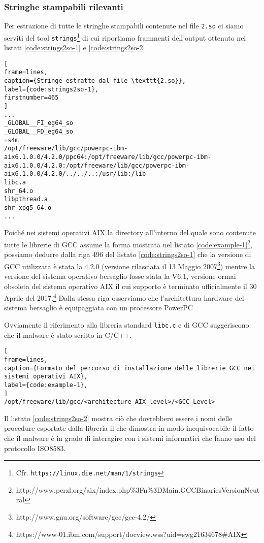 \documentclass[10pt,a4paper, titlepage]{report}
\begin{document}
\subsubsection{Stringhe stampabili rilevanti}\label{strings2so}

Per estrazione di tutte le stringhe stampabili contenute nel file \texttt{2.so} ci siamo serviti del tool \texttt{strings}\footnote{Cfr. \texttt{https://linux.die.net/man/1/strings}} di cui  riportiamo frammenti dell'output ottenuto nei listati \ref{code:strings2so-1} e \ref{code:strings2so-2}.

\begin{lstlisting}[
frame=lines, 
caption={Stringe estratte dal file \texttt{2.so}}, 
label={code:strings2so-1},
firstnumber=465
]
...
_GLOBAL__FI_eg64_so
_GLOBAL__FD_eg64_so
=s4m
/opt/freeware/lib/gcc/powerpc-ibm-aix6.1.0.0/4.2.0/ppc64:/opt/freeware/lib/gcc/powerpc-ibm-aix6.1.0.0/4.2.0:/opt/freeware/lib/gcc/powerpc-ibm-aix6.1.0.0/4.2.0/../../..:/usr/lib:/lib
libc.a
shr_64.o
libpthread.a
shr_xpg5_64.o
...
\end{lstlisting}

Poiché nei sistemi operativi AIX la directory all'interno del quale sono contenute tutte le librerie di GCC assume la forma mostrata nel listato \ref{code:example-1}\footnote{http://www.perzl.org/aix/index.php\%3Fn\%3DMain.GCCBinariesVersionNeutral}, possiamo dedurre dalla riga 496 del listato \ref{code:strings2so-1} che la versione di GCC utilizzata è stata la 4.2.0 (versione rilasciata il 13 Maggio 2007\footnote{http://www.gnu.org/software/gcc/gcc-4.2/}) mentre la versione del sistema operativo bersaglio fosse stata la V6.1, versione ormai obsoleta del sistema operativo AIX il cui supporto è terminato ufficialmente il 30 Aprile del 2017.\footnote{https://www-01.ibm.com/support/docview.wss?uid=swg21634678\#AIX}
Dalla stessa riga osserviamo che l'architettura hardware del sistema bersaglio è equipaggiata con un processore PowerPC

Ovviamente il riferimento alla libreria standard \texttt{libc.c} e di GCC suggeriscono che il malware è stato scritto in C/C++.

\begin{lstlisting}[
frame=lines, 
caption={Formato del percorso di installazione delle librerie GCC nei sistemi operativi AIX}, 
label={code:example-1},
]
/opt/freeware/lib/gcc/<architecture_AIX_level>/<GCC_Level>
\end{lstlisting}

Il listato \ref{code:strings2so-2} mostra ciò che dovrebbero essere i nomi delle procedure esportate dalla libreria il che dimostra in modo inequivocabile il fatto che il malware è in grado di interagire con i sistemi informatici che fanno uso del protocollo ISO8583.
\end{document}
